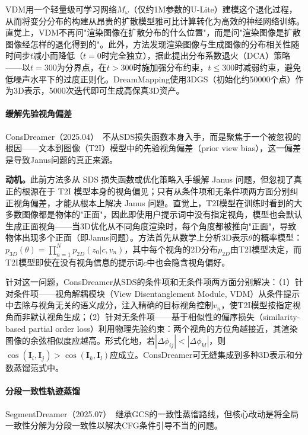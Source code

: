 VDM用一个轻量级可学习网络$M_\omega$（仅约1M参数的U-Lite）建模这个退化过程，从而将变分分布的构建从昂贵的扩散模型雅可比计算转化为高效的神经网络训练。直觉上，VDM不再问"渲染图像在扩散分布的什么位置"，而是问"渲染图像是扩散图像经怎样的退化得到的"。此外，方法发现渲染图像与生成图像的分布相关性随时间步$t$减小而降低（$t=0$时完全独立），据此提出分布系数退火（DCA）策略——以$t=300$为分界点，在$t > 300$时施加强分布约束，$t \leq 300$时减弱约束，避免低噪声水平下的过度正则化。DreamMapping使用3DGS（初始化约50000个点）作为3D表示，5000次迭代即可生成高保真3D资产。

\paragraph{缓解先验视角偏差}

ConsDreamer（2025.04）~\cite{2504_02316}不从SDS损失函数本身入手，而是聚焦于一个被忽视的根因——文本到图像（T2I）模型中的先验视角偏差（prior view bias），这一偏差是导致Janus问题的真正来源。

\textbf{动机。}此前方法多从 SDS 损失函数或优化策略入手缓解 Janus 问题，但忽视了真正的根源在于 T2I 模型本身的视角偏见；只有从条件项和无条件项两方面分别纠正视角偏差，才能从根本上解决 Janus 问题。直觉上，T2I模型在训练时看到的大多数图像都是物体的"正面"，因此即使用户提示词中没有指定视角，模型也会默认生成正面视角——当3D优化从不同角度渲染时，每个角度都被推向"正面"，导致物体出现多个正面（即Janus问题）。方法首先从数学上分析3D表示$\theta$的概率模型：$p_{3D}(\theta) = \prod_{n=1}^N p_{2D}(z_0 | c, v_n)$，其中每个视角的2D分布$p_{2D}$由T2I模型决定，而T2I模型即使在没有视角信息的提示词$c$中也会隐含视角偏好。

针对这一问题，ConsDreamer从SDS的条件项和无条件项两方面分别解决：（1）针对条件项——视角解耦模块（View Disentanglement Module, VDM）从条件提示中去除与视角无关的语义成分，注入精确的目标视角控制$v_n$，使T2I模型按指定视角而非默认视角生成；（2）针对无条件项——基于相似性的偏序损失（similarity-based partial order loss）利用物理先验约束：两个视角的方位角越接近，其渲染图像的余弦相似度应越高。形式化地，若$|\Delta\phi_{ij}| < |\Delta\phi_{kl}|$，则$\cos(\mathbf{I}_i, \mathbf{I}_j) > \cos(\mathbf{I}_k, \mathbf{I}_l)$应成立。ConsDreamer可无缝集成到多种3D表示和分数蒸馏范式中。

\paragraph{分段一致性轨迹蒸馏}

SegmentDreamer（2025.07）~\cite{2507_05256}继承GCS的一致性蒸馏路线，但核心改动是将全局一致性分解为分段一致性以解决CFG条件引导不当的问题。

